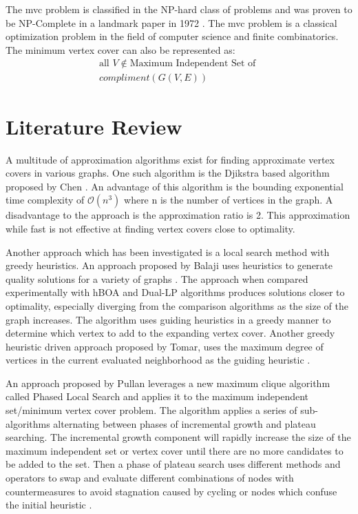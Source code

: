 \documentclass[conference,letterpaper]{IEEEtran}
\begin{document}
\par The mvc problem is classified in the NP-hard class of problems and was proven to be NP-Complete in a landmark paper in 1972 \cite{kar72}. The mvc problem is a classical optimization problem in the field of computer science and finite combinatorics. The minimum vertex cover can also be represented as:
\begin{equation}
    \begin{split}
        \mbox{all } V \notin \mbox{Maximum Independent Set of } \\ 
        compliment(G(V, E))
    \end{split}
\end{equation}

\section{Literature Review}
\par A multitude of approximation algorithms exist for finding approximate vertex covers in various graphs. One such algorithm is the Djikstra based algorithm proposed by Chen \cite{chen16}. An advantage of this algorithm is the bounding exponential time complexity of $\mathcal{O}(n^{3})$ where n is the number of vertices in the graph. A disadvantage to the approach is the approximation ratio is 2. This approximation while fast is not effective at finding vertex covers close to optimality.
\par Another approach which has been investigated is a local search method with greedy heuristics. An approach proposed by Balaji uses heuristics to generate quality solutions for a variety of graphs \cite{balaji13}. The approach when compared experimentally with hBOA and Dual-LP algorithms produces solutions closer to optimality, especially diverging from the comparison algorithms as the size of the graph increases. The algorithm uses guiding heuristics in a greedy manner to determine which vertex to add to the expanding vertex cover. Another greedy heuristic driven approach proposed by Tomar, uses the maximum degree of vertices in the current evaluated neighborhood as the guiding heuristic \cite{tomar14}.
\par An approach proposed by Pullan leverages a new maximum clique algorithm called Phased Local Search \cite{pullan06} and applies it to the maximum independent set/minimum vertex cover problem. The algorithm applies a series of sub-algorithms alternating between phases of incremental growth and plateau searching. The incremental growth component will rapidly increase the size of the maximum independent set or vertex cover until there are no more candidates to be added to the set. Then a phase of plateau search uses different methods and operators to swap and evaluate different combinations of nodes with countermeasures to avoid stagnation caused by cycling or nodes which confuse the initial heuristic \cite{pullan09}.
\end{document}
